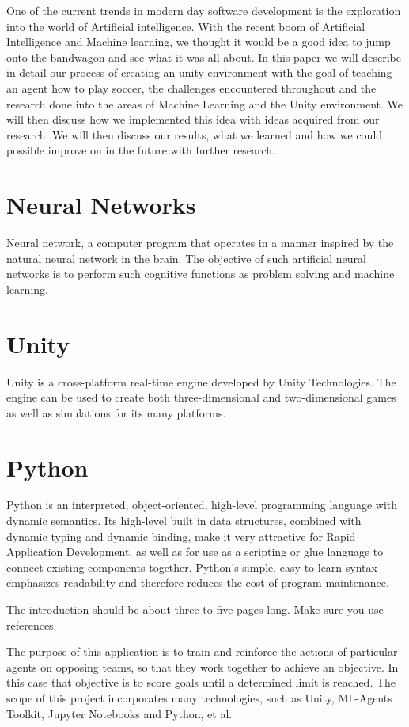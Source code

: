 One of the current trends in modern day software development is the exploration into the world of Artificial intelligence.
With the recent boom of Artificial Intelligence and Machine learning, we thought it would be a good idea to jump onto the bandwagon and see what it was all about.
In this paper we will describe in detail our process of creating an unity environment with the goal of teaching an agent how to play soccer, the challenges encountered throughout and the research done into the areas of Machine Learning and the Unity environment.  We will then discuss how we implemented this idea with ideas acquired from our research. We will then discuss our results, what we learned and how we could possible improve on in the future with further research.

\section{Neural Networks}
Neural network, a computer program that operates in a manner inspired by the natural neural network in the brain. The objective of such artificial neural networks is to perform such cognitive functions as problem solving and machine learning.
\section{Unity}
Unity is a cross-platform real-time engine developed by Unity Technologies. The engine can be used to create both three-dimensional and two-dimensional games as well as simulations for its many platforms.
\section{Python}
Python is an interpreted, object-oriented, high-level programming language with dynamic semantics. Its high-level built in data structures, combined with dynamic typing and dynamic binding, make it very attractive for Rapid Application Development, as well as for use as a scripting or glue language to connect existing components together. Python's simple, easy to learn syntax emphasizes readability and therefore reduces the cost of program maintenance. 



The introduction should be about three to five pages long.
Make sure you use references~\cite{einstein}

The purpose of this application is to train and reinforce the actions of particular agents on opposing teams, so that they work together to achieve an objective. In this case that objective is to score goals until a determined limit is reached. The scope of this project incorporates many technologies, such as Unity, ML-Agents Toolkit, Jupyter Notebooks and Python, et al. 

